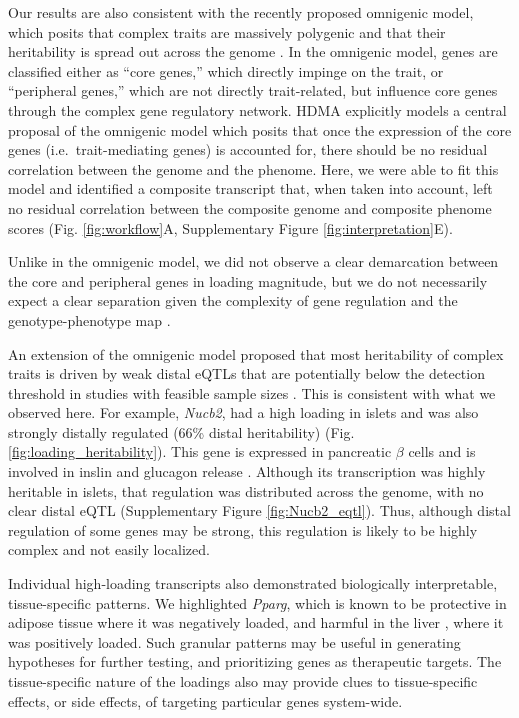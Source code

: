 \documentclass[
]{article}
\begin{document}
Our results are also consistent with the recently proposed omnigenic
model, which posits that complex traits are massively polygenic and that
their heritability is spread out across the genome \cite{pmid28622505}.
In the omnigenic model, genes are classified either as ``core genes,''
which directly impinge on the trait, or ``peripheral genes,'' which are
not directly trait-related, but influence core genes through the complex
gene regulatory network. HDMA explicitly models a central proposal of
the omnigenic model which posits that once the expression of the core
genes (i.e.~trait-mediating genes) is accounted for, there should be no
residual correlation between the genome and the phenome. Here, we were
able to fit this model and identified a composite transcript that, when
taken into account, left no residual correlation between the composite
genome and composite phenome scores (Fig. \ref{fig:workflow}A,
Supplementary Figure \ref{fig:interpretation}E).

Unlike in the omnigenic model, we did not observe a clear demarcation
between the core and peripheral genes in loading magnitude, but we do
not necessarily expect a clear separation given the complexity of gene
regulation and the genotype-phenotype map \cite{pmid29906445}.

An extension of the omnigenic model proposed that most heritability of
complex traits is driven by weak distal eQTLs that are potentially below
the detection threshold in studies with feasible sample sizes
\cite{pmid31051098}. This is consistent with what we observed here. For
example, \textit{Nucb2}, had a high loading in islets and was also
strongly distally regulated (66\% distal heritability) (Fig.
\ref{fig:loading_heritability}). This gene is expressed in pancreatic
\(\beta\) cells and is involved in inslin and glucagon release
\cite{pmid24993278, pmid23537085, pmid22108805}. Although its
transcription was highly heritable in islets, that regulation was
distributed across the genome, with no clear distal eQTL (Supplementary
Figure \ref{fig:Nucb2_eqtl}). Thus, although distal regulation of some
genes may be strong, this regulation is likely to be highly complex and
not easily localized.

Individual high-loading transcripts also demonstrated biologically
interpretable, tissue-specific patterns. We highlighted \textit{Pparg},
which is known to be protective in adipose tissue \cite{pmid17389767}
where it was negatively loaded, and harmful in the liver
\cite{pmid12805374, pmid12618528, 
pmid16357043, pmid15644454, pmid16403437}, where it was positively
loaded. Such granular patterns may be useful in generating hypotheses
for further testing, and prioritizing genes as therapeutic targets. The
tissue-specific nature of the loadings also may provide clues to
tissue-specific effects, or side effects, of targeting particular genes
system-wide.
\end{document}
